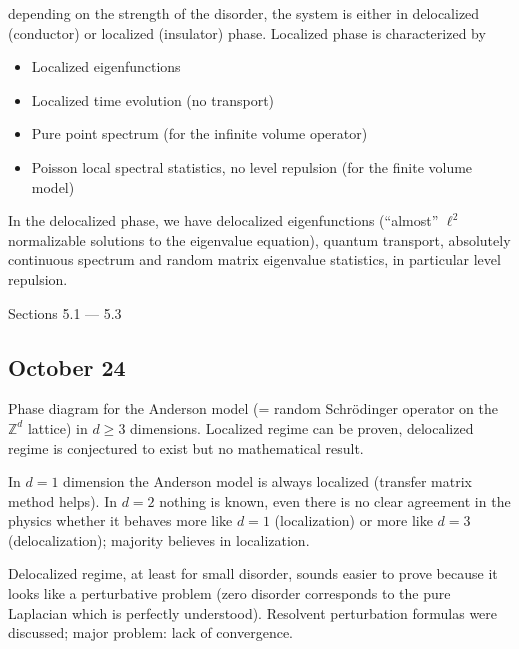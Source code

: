 \documentclass[letterpaper,10pt,english]{sphinxhowto}
\begin{document}
\sphinxAtStartPar
{} depending on the strength of the disorder, the system is either in delocalized (conductor) or localized (insulator) phase. Localized phase is characterized by
\begin{itemize}
\item {} 
\sphinxAtStartPar
Localized eigenfunctions

\item {} 
\sphinxAtStartPar
Localized time evolution (no transport)

\item {} 
\sphinxAtStartPar
Pure point spectrum (for the infinite volume operator)

\item {} 
\sphinxAtStartPar
Poisson local spectral statistics, no level repulsion (for the finite volume model)

\end{itemize}

\sphinxAtStartPar
In the delocalized phase, we have delocalized eigenfunctions (“almost” \(\ell^2\)\sphinxhyphen{}normalizable solutions to the eigenvalue equation), quantum transport, absolutely continuous spectrum and random matrix eigenvalue statistics, in particular level repulsion.

\sphinxAtStartPar
{}  Sections 5.1 — 5.3


\subsection{October 24}
\label{\detokenize{teaching/random_matrices_2017:october-24}}
\sphinxAtStartPar
Phase diagram for the Anderson model (= random Schrödinger operator on the \(\mathbb Z^d\) lattice) in \(d\ge 3\) dimensions. Localized regime can be proven, delocalized regime is conjectured to exist but no mathematical result.

\sphinxAtStartPar
In \(d=1\) dimension the Anderson model is always localized (transfer matrix method helps). In \(d=2\) nothing is known, even there is no clear agreement in the physics whether it behaves more like \(d=1\) (localization) or more like \(d=3\) (delocalization); majority believes in localization.

\sphinxAtStartPar
Delocalized regime, at least for small disorder, sounds easier to prove because it looks like a perturbative problem (zero disorder corresponds to the pure Laplacian which is perfectly understood). Resolvent perturbation formulas were discussed; major problem: lack of convergence.
\end{document}
